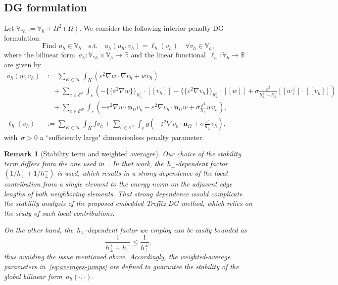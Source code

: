 \documentclass[a4paper,twoside,10pt]{article}
\newtheorem{remark}[theorem]{Remark}
\newcommand{\Vsh}{V_{\!\star \hspace*{-0.2mm}h}}
\newcommand{\jmp}[1]{[\![ #1 ]\!]}
\newcommand{\eps}{\varepsilon}
\newcommand{\calD}{\mathcal{D}}
\newcommand{\calE}{\mathcal{E}}
\newcommand{\calI}{\mathcal{I}}
\newcommand{\calK}{\mathcal{K}}
\newcommand{\bn}{\mathbf{n}}
\numberwithin{equation}{section}
\newcommand{\R}{\mathbb{R}}
\newcommand{\Vh}{\mathbb{V}_{\! h}}
\renewcommand{\Vsh}{\mathbb{V}_{*h}}
\newcommand{\uh}{u_h}
\newcommand{\vh}{v_h}
\newcommand{\hperp}{h_{\perp}}
\newcommand{\mvl}[1]{\{\!\!\{#1\}\!\!\}}
\newcommand{\ah}{a_h}
\newcommand{\lh}{\ell_h}
\begin{document}
	\subsection{DG formulation}\label{ssec:DGformulation}
	Let $\Vsh:=\Vh+H^2(\Omega)$.
	We consider the following interior penalty DG formulation: 
	\begin{equation*}
		\text{Find } \uh \in \Vh \quad \text {s.t.} \quad 
		\ah(\uh, \vh) = \ell_h(\vh) \quad \forall \vh \in \Vh,
	\end{equation*}
	where the bilinear form~$\ah : \Vsh \times \Vh \to \R$ and the linear functional~$\lh : \Vh \to \R$ are given by
	\begin{align}\label{eq:ah}
	\nonumber
		\ah(w, \vh) & := \sum_{K\in \calK} \int_K (\varepsilon^2 \nabla w \cdot \nabla \vh +  w \vh)
		 \\
	\nonumber
	    & \quad +
	\sum_{e \in\calE^{\calI}} \int_{e} (-\mvl{\varepsilon^2 \nabla w}_{\hperp^e} \cdot \jmp{\vh} - \mvl{\varepsilon^2 \nabla \vh}_{\hperp^e} \cdot \jmp{w} +  \sigma\frac{\eps^2}{h^{+}_\perp+h^{-}_\perp} \jmp{w}\cdot\jmp{\vh}) 
	    \\
	    & \quad + \sum_{e\in \calE^{\calD}} \int_{e} (-\varepsilon^2 \nabla w \cdot \bn_{\Omega} \vh - \varepsilon^2 \nabla \vh \cdot \bn_{\Omega} w + \sigma\frac{\eps^2}{\hperp} w \vh) 
	, \\
	    \label{eq:lh}
		\lh(\vh) & := \sum_{K\in \calK} \int_K f \vh 
	 +\sum_{e\in \calE^{\calD}} \int_{e} g (-\varepsilon^2 \nabla \vh \cdot \bn_{\Omega} + \sigma \frac{\eps^2}{\hperp} \vh),
	\end{align}
    with~$\sigma>0$ a ``sufficiently large" dimensionless penalty parameter.
	
	\begin{remark}[Stability term and weighted averages]
	Our choice of the stability term differs from the one used in~\cite[Lemma 8.1]{G06hp}. In that work, the~$\hperp$-dependent factor~$(1/\hperp^+ + 1/\hperp^-)$ is used, which results in a strong dependence of the local contribution from a single element 
	to the energy norm on the adjacent edge lengths of both neighboring elements. That strong dependence would complicate the stability analysis of the proposed embedded Trefftz DG method,  which relies on the study of such local contributions.
	
	On the other hand, the~$\hperp$-dependent factor we employ can be easily bounded as $$\frac{1}{\hperp^+ + \hperp^-} \le \frac{1}{\hperp^{\pm}},$$ 
	thus avoiding the issue mentioned above. Accordingly, the weighted-average parameters in~\eqref{eq:averages-jumps} are defined to guarantee the stability of the global bilinear form~$\ah(\cdot, \cdot)$.
	\end{remark}
	
\end{document}
